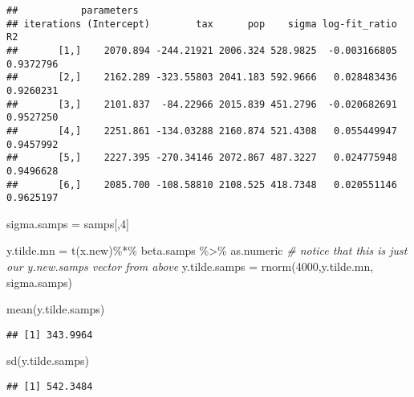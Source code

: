 \documentclass[
]{article}
\newenvironment{Shaded}{\begin{snugshade}}{\end{snugshade}}
\newcommand{\CommentTok}[1]{\textcolor[rgb]{0.56,0.35,0.01}{\textit{#1}}}
\newcommand{\DecValTok}[1]{\textcolor[rgb]{0.00,0.00,0.81}{#1}}
\newcommand{\FunctionTok}[1]{\textcolor[rgb]{0.00,0.00,0.00}{#1}}
\newcommand{\NormalTok}[1]{#1}
\newcommand{\OtherTok}[1]{\textcolor[rgb]{0.56,0.35,0.01}{#1}}
\newcommand{\SpecialCharTok}[1]{\textcolor[rgb]{0.00,0.00,0.00}{#1}}
\begin{document}
\begin{verbatim}
##           parameters
## iterations (Intercept)        tax      pop    sigma log-fit_ratio        R2
##       [1,]    2070.894 -244.21921 2006.324 528.9825  -0.003166805 0.9372796
##       [2,]    2162.289 -323.55803 2041.183 592.9666   0.028483436 0.9260231
##       [3,]    2101.837  -84.22966 2015.839 451.2796  -0.020682691 0.9527250
##       [4,]    2251.861 -134.03288 2160.874 521.4308   0.055449947 0.9457992
##       [5,]    2227.395 -270.34146 2072.867 487.3227   0.024775948 0.9496628
##       [6,]    2085.700 -108.58810 2108.525 418.7348   0.020551146 0.9625197
\end{verbatim}

\begin{Shaded}
\begin{Highlighting}[]
\NormalTok{sigma.samps }\OtherTok{=}\NormalTok{ samps[,}\DecValTok{4}\NormalTok{]}

\NormalTok{y.tilde.mn }\OtherTok{=} \FunctionTok{t}\NormalTok{(x.new)}\SpecialCharTok{\%*\%}\NormalTok{ beta.samps }\SpecialCharTok{\%\textgreater{}\%}\NormalTok{ as.numeric }\CommentTok{\# notice that this is just our y.new.samps vector from above}
\NormalTok{y.tilde.samps }\OtherTok{=} \FunctionTok{rnorm}\NormalTok{(}\DecValTok{4000}\NormalTok{,y.tilde.mn, sigma.samps)}

\FunctionTok{mean}\NormalTok{(y.tilde.samps)}
\end{Highlighting}
\end{Shaded}

\begin{verbatim}
## [1] 343.9964
\end{verbatim}

\begin{Shaded}
\begin{Highlighting}[]
\FunctionTok{sd}\NormalTok{(y.tilde.samps)}
\end{Highlighting}
\end{Shaded}

\begin{verbatim}
## [1] 542.3484
\end{verbatim}
\end{document}
